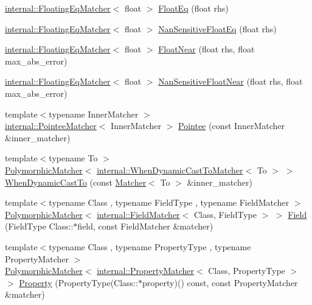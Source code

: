 \begin{DoxyCompactItemize}
\hyperlink{classtesting_1_1internal_1_1_floating_eq_matcher}{internal\+::\+Floating\+Eq\+Matcher}$<$ float $>$ \hyperlink{namespacetesting_ac75507edb7998957b48fb17a9b8a020b}{Float\+Eq} (float rhs)
\item 
\hyperlink{classtesting_1_1internal_1_1_floating_eq_matcher}{internal\+::\+Floating\+Eq\+Matcher}$<$ float $>$ \hyperlink{namespacetesting_ab3653439a654b85bdccff46d1436670d}{Nan\+Sensitive\+Float\+Eq} (float rhs)
\item 
\hyperlink{classtesting_1_1internal_1_1_floating_eq_matcher}{internal\+::\+Floating\+Eq\+Matcher}$<$ float $>$ \hyperlink{namespacetesting_a933a78452dd1770669bed758f35ff250}{Float\+Near} (float rhs, float max\+\_\+abs\+\_\+error)
\item 
\hyperlink{classtesting_1_1internal_1_1_floating_eq_matcher}{internal\+::\+Floating\+Eq\+Matcher}$<$ float $>$ \hyperlink{namespacetesting_a347ebf0075ca9470e71e8ac468c9818f}{Nan\+Sensitive\+Float\+Near} (float rhs, float max\+\_\+abs\+\_\+error)
\item 
{\footnotesize template$<$typename Inner\+Matcher $>$ }\\\hyperlink{classtesting_1_1internal_1_1_pointee_matcher}{internal\+::\+Pointee\+Matcher}$<$ Inner\+Matcher $>$ \hyperlink{namespacetesting_a5122ca3533f3a00f67e146dd81f3b68c}{Pointee} (const Inner\+Matcher \&inner\+\_\+matcher)
\item 
{\footnotesize template$<$typename To $>$ }\\\hyperlink{classtesting_1_1_polymorphic_matcher}{Polymorphic\+Matcher}$<$ \hyperlink{classtesting_1_1internal_1_1_when_dynamic_cast_to_matcher}{internal\+::\+When\+Dynamic\+Cast\+To\+Matcher}$<$ To $>$ $>$ \hyperlink{namespacetesting_aabfc320cc132d0a1da2a255b45a17b7a}{When\+Dynamic\+Cast\+To} (const \hyperlink{classtesting_1_1_matcher}{Matcher}$<$ To $>$ \&inner\+\_\+matcher)
\item 
{\footnotesize template$<$typename Class , typename Field\+Type , typename Field\+Matcher $>$ }\\\hyperlink{classtesting_1_1_polymorphic_matcher}{Polymorphic\+Matcher}$<$ \hyperlink{classtesting_1_1internal_1_1_field_matcher}{internal\+::\+Field\+Matcher}$<$ Class, Field\+Type $>$ $>$ \hyperlink{namespacetesting_a4df3849391696aa93ac3a7703a717c2a}{Field} (Field\+Type Class\+::$\ast$field, const Field\+Matcher \&matcher)
\item 
{\footnotesize template$<$typename Class , typename Property\+Type , typename Property\+Matcher $>$ }\\\hyperlink{classtesting_1_1_polymorphic_matcher}{Polymorphic\+Matcher}$<$ \hyperlink{classtesting_1_1internal_1_1_property_matcher}{internal\+::\+Property\+Matcher}$<$ Class, Property\+Type $>$ $>$ \hyperlink{namespacetesting_a0fad10571e23f7bc0d5c83d4c31ba740}{Property} (Property\+Type(Class\+::$\ast$property)() const, const Property\+Matcher \&matcher)

\end{DoxyCompactItemize}
